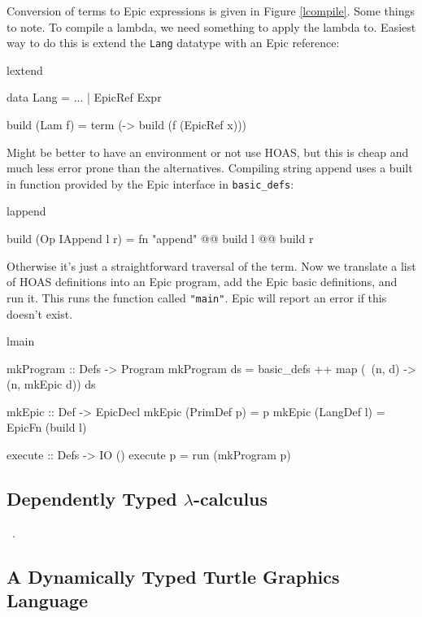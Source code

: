 Conversion of terms to Epic expressions is given in Figure
\ref{lcompile}. Some things to note. To compile a lambda, we need
something to apply the lambda to. Easiest way to do this is extend the
\texttt{Lang} datatype with an Epic reference:

\begin{SaveVerbatim}{lextend}

data Lang = ...
          | EpicRef Expr

build (Lam f)          = term (\x -> build (f (EpicRef x)))

\end{SaveVerbatim}

Might be better to have an environment or not use HOAS, but this is
cheap and much less error prone than the alternatives.
Compiling string append uses a built in function provided by the Epic
interface in \texttt{basic\_defs}:

\begin{SaveVerbatim}{lappend}

build (Op IAppend l r) = fn "append" @@ build l @@ build r

\end{SaveVerbatim}

Otherwise it's just a straightforward traversal of the term. Now we
translate a list of HOAS definitions into an Epic program, add the
Epic basic definitions, and run it. This runs the function called
\texttt{"main"}. Epic will report an error if this doesn't exist.

\begin{SaveVerbatim}{lmain}

mkProgram :: Defs -> Program
mkProgram ds = basic_defs ++ 
               map (\ (n, d) -> (n, mkEpic d)) ds

mkEpic :: Def -> EpicDecl
mkEpic (PrimDef p) = p
mkEpic (LangDef l) = EpicFn (build l)

execute :: Defs -> IO ()
execute p = run (mkProgram p)

\end{SaveVerbatim}

\subsection{Dependently Typed $\lambda$-calculus}

\LamPi{}~\cite{simply-easy}.

\subsection{A Dynamically Typed Turtle Graphics Language}



